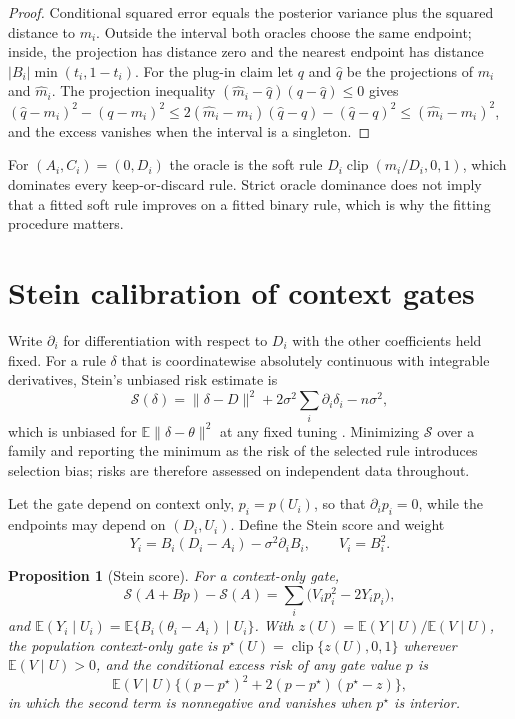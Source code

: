 \documentclass[11pt]{article}
\theoremstyle{plain}
\newtheorem{proposition}{Proposition}
\theoremstyle{definition}
\theoremstyle{remark}
\newcommand{\E}{\mathbb E}
\DeclareMathOperator{\clip}{clip}
\begin{document}
\begin{proof}
Conditional squared error equals the posterior variance plus the squared distance to $m_i$.
Outside the interval both oracles choose the same endpoint; inside, the projection has
distance zero and the nearest endpoint has distance $|B_i|\min(t_i,1-t_i)$. For the plug-in
claim let $q$ and $\widehat q$ be the projections of $m_i$ and $\widehat m_i$. The
projection inequality $(\widehat m_i-\widehat q)(q-\widehat q)\le0$ gives
$(\widehat q-m_i)^2-(q-m_i)^2\le2(\widehat m_i-m_i)(\widehat q-q)-(\widehat q-q)^2
\le(\widehat m_i-m_i)^2$, and the excess vanishes when the interval is a singleton.
\end{proof}

For $(A_i,C_i)=(0,D_i)$ the oracle is the soft rule $D_i\clip(m_i/D_i,0,1)$, which dominates
every keep-or-discard rule. Strict oracle dominance does not imply that a fitted soft rule
improves on a fitted binary rule, which is why the fitting procedure matters.

\section{Stein calibration of context gates}\label{sec:stein}

Write $\partial_i$ for differentiation with respect to $D_i$ with the other coefficients
held fixed. For a rule $\delta$ that is coordinatewise absolutely continuous with integrable
derivatives, Stein's unbiased risk estimate is
\begin{equation}\label{eq:sure}
\mathcal S(\delta)=\|\delta-D\|^2+2\sigma^2\sum_i\partial_i\delta_i-n\sigma^2,
\end{equation}
which is unbiased for $\E\|\delta-\theta\|^2$ at any fixed tuning
\citep{stein1981estimation,donoho1995adapting}. Minimizing $\mathcal S$ over a family and
reporting the minimum as the risk of the selected rule introduces selection bias; risks
are therefore assessed on independent data throughout.

Let the gate depend on context only, $p_i=p(U_i)$, so that $\partial_ip_i=0$, while the
endpoints may depend on $(D_i,U_i)$. Define the Stein score and weight
\begin{equation}\label{eq:score}
Y_i=B_i(D_i-A_i)-\sigma^2\partial_iB_i,\qquad V_i=B_i^2 .
\end{equation}

\begin{proposition}[Stein score]\label{prop:score}
For a context-only gate,
\begin{equation}\label{eq:quadratic}
\mathcal S(A+Bp)-\mathcal S(A)=\sum_i\bigl(V_ip_i^2-2Y_ip_i\bigr),
\end{equation}
and $\E(Y_i\mid U_i)=\E\{B_i(\theta_i-A_i)\mid U_i\}$. With
$z(U)=\E(Y\mid U)/\E(V\mid U)$, the population context-only gate is
$p^\star(U)=\clip\{z(U),0,1\}$ wherever $\E(V\mid U)>0$, and the conditional excess risk of
any gate value $p$ is
\begin{equation}\label{eq:excess}
\E(V\mid U)\bigl\{(p-p^\star)^2+2(p-p^\star)(p^\star-z)\bigr\},
\end{equation}
in which the second term is nonnegative and vanishes when $p^\star$ is interior.
\end{proposition}
\end{document}
